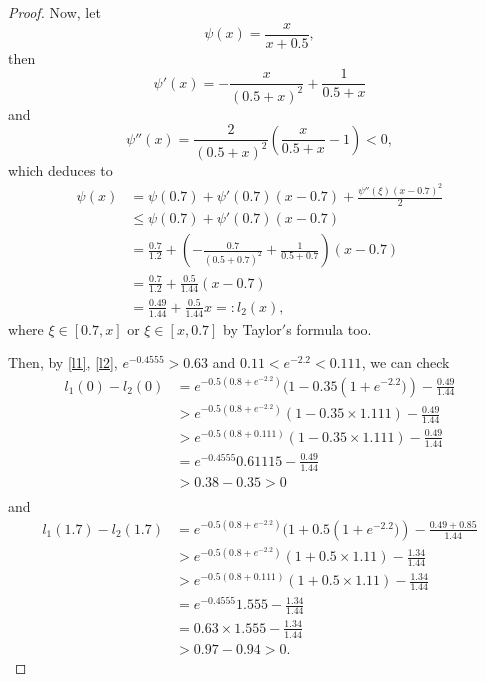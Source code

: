 \documentclass{HZNUMCM}
\begin{document}
\begin{proof}
Now, let
$$
\psi(x)=\frac x {x+0.5},
$$then
$$
\psi'(x)=-\frac{x}{(0.5 +x)^2}+\frac{1}{0.5 +x}
$$
and
$$
\psi''(x)=\frac{2}{(0.5 +x)^2}\left(\frac{x}{0.5+x}-1\right)<0,
$$
which deduces to
\begin{equation}\label{l2}
\begin{split}
\psi(x)&=\psi(0.7)+\psi'(0.7)(x-0.7)+\frac{\psi''(\xi)(x-0.7)^2}2\\
&\leqslant \psi(0.7)+\psi'(0.7)(x-0.7)\\
&=\frac{0.7}{1.2}+\left(-\frac{0.7}{(0.5 +0.7)^2}+\frac{1}{0.5 +0.7}\right)(x-0.7)\\
&=\frac{0.7}{1.2}+\frac{0.5}{1.44}(x-0.7)\\
&=\frac{0.49}{1.44}+\frac{0.5}{1.44}x=:l_2(x),
\end{split}
\end{equation}where $\xi\in[0.7,x] \text{~or~} \xi\in[x,0.7]$
by Taylor$'$s formula too.

Then, by \eqref{l1}, \eqref{l2}, $e^{-0.4555}>0.63$ and  $0.11<e^{-2.2}<0.111$,  we can check
\begin{equation}\label{l1-l2at0}
\begin{split}
l_1(0)-l_2(0)&=e^{-0.5(0.8 + e^{-2.2} )}(1-0.35 \left(1+e^{-2.2})\right)-\frac{0.49}{1.44}\\
&> e^{-0.5(0.8 + e^{-2.2} )}(1-0.35 \times 1.111)-\frac{0.49}{1.44}\\
&> e^{-0.5(0.8 +0.111 )}(1-0.35 \times 1.111)-\frac{0.49}{1.44}\\
&= e^{-0.4555}0.61115-\frac{0.49}{1.44}\\
&> 0.38-0.35>0\\
\end{split}
\end{equation}
and
\begin{equation}\label{l1-l2at1.7}
\begin{split}
l_1(1.7)-l_2(1.7)&=e^{-0.5(0.8 + e^{-2.2} )}(1+0.5 \left(1+e^{-2.2})\right)-\frac{0.49+0.85}{1.44}\\
&> e^{-0.5(0.8 + e^{-2.2} )}(1+0.5 \times 1.11)-\frac{1.34}{1.44}\\
&> e^{-0.5(0.8 +0.111 )}(1+0.5 \times 1.11)-\frac{1.34}{1.44}\\
&= e^{-0.4555}1.555-\frac{1.34}{1.44}\\
&= 0.63\times1.555-\frac{1.34}{1.44}\\
&> 0.97-0.94>0.
\end{split}
\end{equation}



\end{proof}
\end{document}
